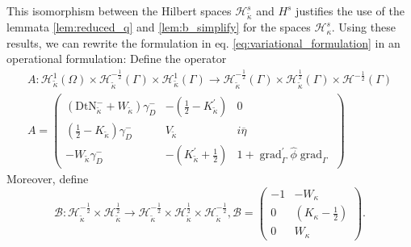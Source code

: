 \documentclass[12pt,journal,compsoc, onecolumn]{IEEEtran}
\begin{document}
This isomorphism between the Hilbert spaces $\mathcal{H}_{\tilde \kappa}^{s}$ and ${H}^{s}$ justifies the use of the lemmata \ref{lem:reduced_q} and \ref{lem:b_simplify} for the spaces $\mathcal{H}_\kappa^{s}$.
Using these results, we can rewrite the formulation in eq. \ref{eq:variational_formulation} in an operational formulation:  Define the operator 
\begin{align*}
A: \mathcal{H}_{\tilde \kappa}^1(\Omega) \times \mathcal{H}_{\tilde \kappa}^{-\frac{1}{2}}(\Gamma) \times \mathcal{H}_{\tilde \kappa}^{1}(\Gamma) \rightarrow \mathcal{H}_{\tilde \kappa}^{-\frac{1}{2}}(\Gamma) \times \mathcal{H}_{\tilde \kappa}^{\frac{1}{2}}(\Gamma) \times \mathcal{H}^{-\frac{1}{2}}(\Gamma) \\
    A = \begin{pmatrix}
            (\mathrm{DtN}_{\tilde \kappa}^{-} + W_{\tilde \kappa}) \gamma_D^- & - (\frac{1}{2} - K^\prime_{\tilde \kappa}) & 0 \\
            (\frac{1}{2} - K_{\tilde \kappa})\gamma_D^- & V_{\tilde \kappa} & i \overline{\eta} \\
            - W_{\tilde \kappa}\gamma_D^- & - (K^\prime_{\tilde \kappa} + \frac{1}{2}) & 1 + \operatorname{grad}_{\Gamma}^\prime \hat{\phi}\operatorname{grad}_{\Gamma} 
    \end{pmatrix}
\end{align*}
Moreover, define  $$\mathcal{B}:
\mathcal{H}^{-\frac{1}{2}}_{\tilde\kappa} \times \mathcal{H}^{\frac{1}{2}}_{\tilde\kappa} \rightarrow
\mathcal{H}^{-\frac{1}{2}}_{\tilde\kappa} \times \mathcal{H}^{\frac{1}{2}}_{\tilde\kappa} \times \mathcal{H}^{-\frac{1}{2}}_{\tilde\kappa}, \mathcal{B} = 
\begin{pmatrix}
    -1 & -W_{\kappa}  \\
    0 & ( K_{\kappa} - \frac{1}{2}) \\
    0 & W_{\kappa}
\end{pmatrix}.
$$
\end{document}
